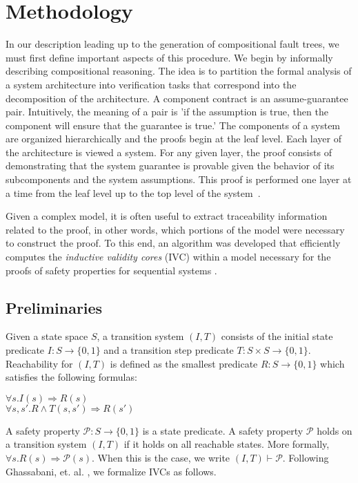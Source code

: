 \section{Methodology}
In our description leading up to the generation of compositional fault trees, we must first define important aspects of this procedure. We begin by informally describing compositional reasoning. The idea is to partition the formal analysis of a system architecture into verification tasks that correspond into the decomposition of the architecture. A component contract is an assume-guarantee pair. Intuitively, the meaning of a pair is 'if the assumption is true, then the component will ensure that the guarantee is true.' The components of a system are organized hierarchically and the proofs begin at the leaf level. Each layer of the architecture is viewed a system. For any given layer, the proof consists of demonstrating that the system guarantee is provable given the behavior of its subcomponents and the system assumptions. This proof is performed one layer at a time from the leaf level up to the top level of the system~\cite{NFM2012:CoGaMiWhLaLu}. 

Given a complex model, it is often useful to extract traceability information related to the proof, in other words, which portions of the model were necessary to construct the proof. To this end, an algorithm was developed that efficiently computes the \textit{inductive validity cores} (IVC) within a model necessary for the proofs of safety properties for sequential systems \cite{DBLP:journals/corr/GhassabaniGW16}. 

\subsection{Preliminaries}
Given a state space $S$, a transition system $(I,T)$ consists of the initial state predicate $I : S \rightarrow \{0,1\}$ and a transition step predicate $T : S \times S \rightarrow \{0,1\}$. Reachability for $(I,T)$ is defined as the smallest predicate $R : S \rightarrow \{0,1\}$ which satisfies the following formulas:
\begin{center}
$\forall s. I(s) \Rightarrow R(s)$\\
$\forall s, s' .  R \land T(s,s') \Rightarrow R(s')$\\
\end{center}
A safety property $\mathcal{P} : S \to \{0,1\}$ is a state predicate. A safety property $\mathcal{P}$ holds on a transition system $(I,T)$ if it holds on all reachable states. More formally, $\forall s . R(s) \Rightarrow \mathcal{P}(s)$. When this is the case, we write $(I,T) \vdash\mathcal{P}$. Following Ghassabani, et. al. \cite{DBLP:journals/corr/GhassabaniGW16}, we formalize IVCs as follows.\\

